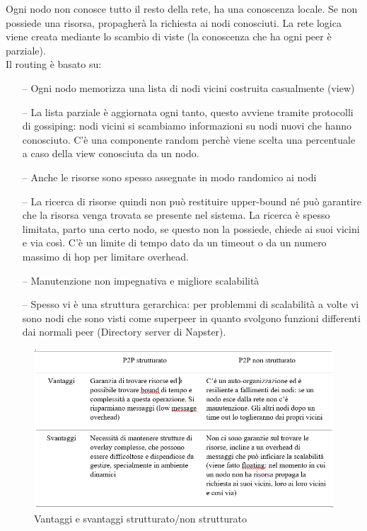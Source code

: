 \documentclass[12pt,italian]{report}
\begin{document}
Ogni nodo non conosce tutto il resto della rete, ha una conoscenza locale. Se non possiede una risorsa, propagherà la richiesta ai nodi conosciuti. La rete logica viene creata mediante lo scambio di viste (la conoscenza che ha ogni peer è parziale). \\ Il routing è basato su:
\begin{itemize}
    \item [--] Ogni nodo memorizza una lista di nodi vicini costruita casualmente (view)
    \item [--] La lista parziale è aggiornata ogni tanto, questo avviene tramite protocolli di gossiping: nodi vicini si scambiamo informazioni su nodi nuovi che hanno conosciuto. C'è una componente random perchè viene scelta una percentuale a caso della view conosciuta da un nodo.
    \item [--] Anche le risorse sono spesso assegnate in modo randomico ai nodi
    \item [--] La ricerca di risorse quindi non può restituire upper-bound né può garantire che la risorsa venga trovata se presente nel sistema. La ricerca è spesso limitata, parto una certo nodo, se questo non la possiede, chiede ai suoi vicini e via così. C'è un limite di tempo dato da un timeout o da un numero massimo di hop per limitare overhead. 
    \item [--] Manutenzione non impegnativa e migliore scalabilità
    \item [--] Spesso vi è una struttura gerarchica: per problemmi di scalabilità a volte vi sono nodi che sono visti come superpeer in quanto svolgono funzioni differenti dai normali peer (Directory server di Napster). 
\end{itemize}

\begin{figure}[h]
\centering
\includegraphics[width=130mm]{img/proscos.PNG}
\caption{Vantaggi e svantaggi strutturato/non strutturato}
\label{fig:vssn}
\end{figure}
\end{document}
